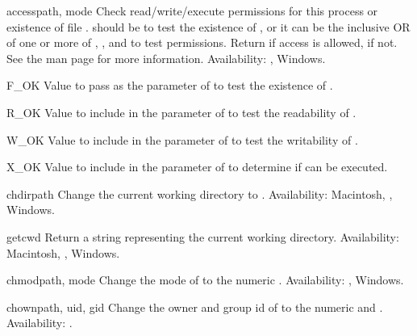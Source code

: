 \begin{funcdesc}{access}{path, mode}
Check read/write/execute permissions for this process or existence of
file .   should be  to test the
existence of , or it can be the inclusive OR of one or more
of , , and  to test
permissions.  Return  if access is allowed,  if not.
See the \UNIX{} man page  for more information.
Availability: \UNIX{}, Windows.
\end{funcdesc}

\begin{datadesc}{F_OK}
  Value to pass as the  parameter of  to
  test the existence of .
\end{datadesc}

\begin{datadesc}{R_OK}
  Value to include in the  parameter of 
  to test the readability of .
\end{datadesc}

\begin{datadesc}{W_OK}
  Value to include in the  parameter of 
  to test the writability of .
\end{datadesc}

\begin{datadesc}{X_OK}
  Value to include in the  parameter of 
  to determine if  can be executed.
\end{datadesc}

\begin{funcdesc}{chdir}{path}
Change the current working directory to .
Availability: Macintosh, \UNIX{}, Windows.
\end{funcdesc}

\begin{funcdesc}{getcwd}{}
Return a string representing the current working directory.
Availability: Macintosh, \UNIX{}, Windows.
\end{funcdesc}

\begin{funcdesc}{chmod}{path, mode}
Change the mode of  to the numeric .
Availability: \UNIX{}, Windows.
\end{funcdesc}

\begin{funcdesc}{chown}{path, uid, gid}
Change the owner and group id of  to the numeric 
and .
Availability: \UNIX{}.
\end{funcdesc}

